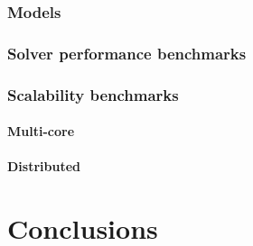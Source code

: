 	\subsection{Models}
	\subsection{Solver performance benchmarks}
	\subsection{Scalability benchmarks}
		\subsubsection{Multi-core}
		\subsubsection{Distributed}

\chapter{Conclusions}

  \printbibliography[heading=bibintoc] %



